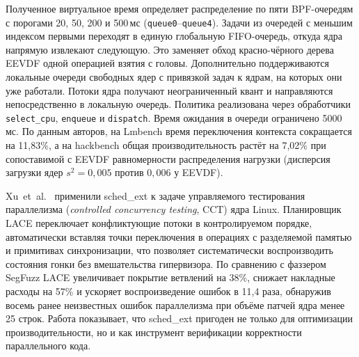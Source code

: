 \documentclass[14pt, oneside]{extbook}
\begin{document}
        Полученное виртуальное время определяет распределение
        по пяти BPF-очередям с порогами 20, 50, 200 и 500\,мс
        (\texttt{queue0}--\texttt{queue4}). Задачи из очередей с
        меньшим индексом первыми переходят в единую глобальную
        FIFO-очередь, откуда ядра напрямую извлекают следующую.
        Это заменяет обход красно-чёрного дерева EEVDF одной
        операцией взятия с головы. Дополнительно поддерживаются
        локальные очереди свободных ядер с привязкой задач к
        ядрам, на которых они уже работали. Потоки ядра получают
        неограниченный квант и направляются непосредственно в
        локальную очередь. Политика реализована через обработчики
        \texttt{select\_cpu}, \texttt{enqueue} и \texttt{dispatch}.
        Время ожидания в очереди ограничено 5000\,мс. По данным
        авторов, на Lmbench время переключения контекста
        сокращается на 11,83\%, а на hackbench общая
        производительность растёт на 7,02\% при сопоставимой с
        EEVDF равномерности распределения нагрузки (дисперсия загрузки
        ядер $s^2 = 0{,}005$ против $0{,}006$ у EEVDF).

        Xu~et~al.~\cite{lace} применили sched\_ext к задаче
        управляемого тестирования параллелизма (\emph{controlled
        concurrency testing}, CCT) ядра Linux. Планировщик LACE
        переключает конфликтующие потоки в контролируемом порядке,
        автоматически вставляя точки переключения в операциях с
        разделяемой памятью и примитивах синхронизации, что
        позволяет систематически воспроизводить состояния гонки
        без вмешательства гипервизора. По сравнению с фаззером
        SegFuzz LACE увеличивает покрытие ветвлений на 38\%,
        снижает накладные расходы на 57\% и ускоряет
        воспроизведение ошибок в 11,4 раза, обнаружив восемь ранее
        неизвестных ошибок параллелизма при объёме патчей ядра
        менее 25 строк. Работа
        показывает, что sched\_ext пригоден не только для оптимизации
        производительности, но и как инструмент верификации
        корректности параллельного кода.
\end{document}
